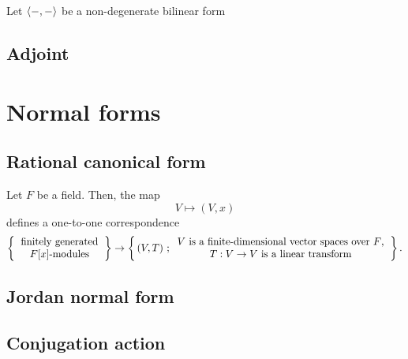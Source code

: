 \documentclass{../../large}
\begin{document}
\begin{prb}
Let $\langle-,-\rangle$ be a non-degenerate bilinear form
\end{prb}


\section{Adjoint}
\begin{prb}
\end{prb}








\chapter{Normal forms}
\section{Rational canonical form}
\begin{prb}
Let $F$ be a field.
Then, the map
\[V\mapsto(V,x)\]
defines a one-to-one correspondence
\[\left\{\begin{tabular}{c}finitely generated\\$F[x]$-modules\end{tabular}\right\}\to\left\{\,(V,T)\ ;\begin{tabular}{c}$V$ is a finite-dimensional vector spaces over $F$,\\$T:V\to V$ is a linear transform\end{tabular}\right\}.\]
\end{prb}
\begin{prb}
\end{prb}

\section{Jordan normal form}


\section{Conjugation action}
\begin{prb}
\end{prb}

\begin{prb}
\end{prb}
\end{document}
